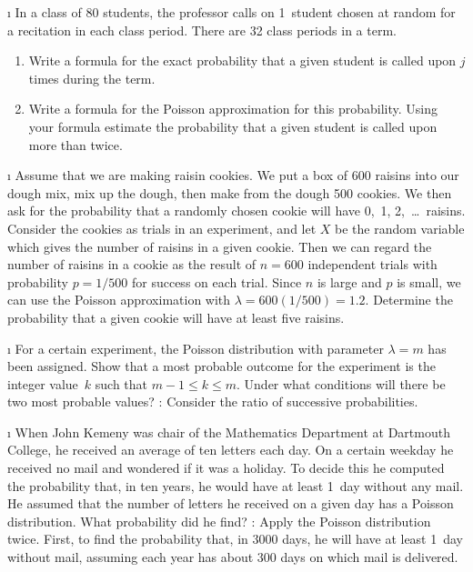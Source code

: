 \begin{LJSItem}
\i\label{exer 5.1.116} In a class of 80 students, the professor calls on 1~student
chosen at random for a recitation in each class period.  There are 32 class periods in
a term.
\begin{enumerate}
\item Write a formula for the exact probability that a given student is called upon
$j$ times during the term.

\item Write a formula for the Poisson approximation for this probability.  Using your
formula estimate the probability that a given student is called upon more than twice.
\end{enumerate}

\i\label{exer 5.1.29} Assume that we are making raisin cookies.  We put a box of
600 raisins into our dough mix, mix up the dough, then make from the dough 500
cookies.  We then ask for the probability that a randomly chosen cookie will have
0,~1, 2,~\dots\ raisins.  Consider the cookies as trials in an experiment, and let $X$
be the random variable which gives the number of raisins in a given cookie.  Then we
can regard the number of raisins in a cookie as the result of $n = 600$ independent
trials with probability $p = 1/500$ for success on each trial.  Since $n$ is large and
$p$ is small, we can use the Poisson approximation with $\lambda = 600(1/500) = 1.2$. 
Determine the probability that a given cookie will have at least five raisins.  

\i\label{exer 5.1.117} For a certain experiment, the Poisson distribution with
parameter $\lambda = m$ has been assigned.  Show that a most probable outcome for the
experiment is the integer value~$k$ such that $m - 1 \leq k \leq m$.  Under what
conditions will there be two most probable values?   : Consider the ratio
of successive probabilities.

\i\label{exer 5.1.118} When John Kemeny was chair of the Mathematics
Department at Dartmouth College, he received an average of ten letters each day.  On a certain
weekday he received no mail and wondered if it was a holiday.  To decide this he
computed the probability that, in ten years, he would have at least 1~day without any
mail.  He assumed that the number of letters he received on a given day has a Poisson
distribution.  What probability did he find?   : Apply the Poisson
distribution twice.  First, to find the probability that, in 3000 days, he will have
at least 1~day without mail, assuming each year has about 300 days on which mail is
delivered.
 

\end{LJSItem}
